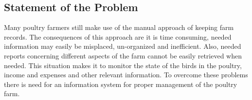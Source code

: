 \documentclass{article}
\begin{document}
\subsection{Statement of the Problem}
Many poultry farmers still make use of the manual approach of keeping farm records. The consequences of this approach are it is time consuming, needed information may easily be misplaced, un-organized and inefficient. Also, needed reports concerning different aspects of the farm cannot be easily retrieved when needed. This situation makes it to monitor the state of the birds in the poultry, income and expenses and other relevant information. To overcome these problems there is need for an information system for proper management of the poultry farm.
\end{document}
